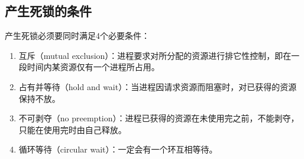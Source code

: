 \subsection{产生死锁的条件}

产生死锁必须要同时满足4个必要条件：

\begin{enumerate}
	\item 互斥（mutual exclusion）：进程要求对所分配的资源进行排它性控制，即在一段时间内某资源仅有一个进程所占用。
	
	\item 占有并等待（hold and wait）：当进程因请求资源而阻塞时，对已获得的资源保持不放。
	
	\item 不可剥夺（no preemption）：进程已获得的资源在未使用完之前，不能剥夺，只能在使用完时由自己释放。
	
	\item 循环等待（circular wait）：一定会有一个环互相等待。
\end{enumerate}

